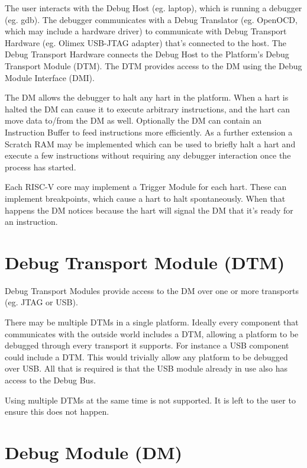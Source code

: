\documentclass{article}
\begin{document}
The user interacts with the Debug Host (eg. laptop), which is running a
debugger (eg. gdb).  The debugger communicates with a Debug Translator (eg.
OpenOCD, which may include a hardware driver) to communicate with Debug
Transport Hardware (eg.  Olimex USB-JTAG adapter) that's connected to the host.
The Debug Transport Hardware connects the Debug Host to the Platform's Debug
Transport Module (DTM).  The DTM provides access to the DM using the Debug
Module Interface (DMI).

The DM allows the debugger to halt any hart in the platform.  When a hart is
halted the DM can cause it to execute arbitrary instructions, and the hart can
move data to/from the DM as well.  Optionally the DM can contain an Instruction
Buffer to feed instructions more efficiently. As a further extension a Scratch
RAM may be implemented which can be used to briefly halt a hart and execute a
few instructions without requiring any debugger interaction once the process
has started.

Each RISC-V core may implement a Trigger Module for each hart.  These can
implement breakpoints, which cause a hart to halt spontaneously.  When that
happens the DM notices because the hart will signal the DM that it's ready for
an instruction.

\section{Debug Transport Module (DTM)}

Debug Transport Modules provide access to the DM over one or more transports
(eg. JTAG or USB).

There may be multiple DTMs in a single platform. Ideally every component that
communicates with the outside world includes a DTM, allowing a platform to be
debugged through every transport it supports.  For instance a USB component
could include a DTM. This would trivially allow any platform to be debugged
over USB. All that is required is that the USB module already in use also has
access to the Debug Bus.

Using multiple DTMs at the same time is not supported. It is left to the user
to ensure this does not happen.

\section{Debug Module (DM)} \label{dm}
\end{document}
